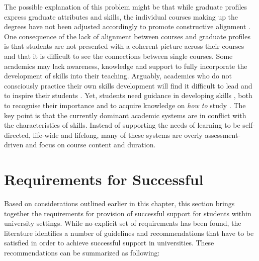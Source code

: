 The possible explanation of this problem might be that while graduate profiles
express graduate attributes and \LLLs skills, the individual courses making up
the degrees have not been adjusted accordingly to promote constructive alignment
\citep{Hughes2010,Biggs2007}. One consequence of the lack of alignment between
courses and graduate profiles is that students are not presented with a coherent
picture across their courses and that it is difficult to see the connections
between single courses. Some academics may lack awareness, knowledge and support
to fully incorporate the development of \LLLs skills into their teaching.
Arguably, academics who do not consciously practice their own \LLLs skills
development will find it difficult to lead and to inspire their students
\citep{Linden2003}. Yet, students need guidance in developing \LLLs skills
\citep{Leone2019}, both to recognise their importance and to acquire knowledge
on \textit{how to} study \citep{Medel-Anonuevo2001}. The key point is that the
currently dominant academic systems are in conflict with the characteristics of
\LLLs skills. Instead of supporting the needs of learning to be self-directed,
life-wide and lifelong, many of these systems are overly assessment-driven and
focus on course content and duration.

\section{Requirements for Successful \LLLc}
\label{sec:needs}
Based on considerations outlined earlier in this chapter, this section brings
together the requirements for provision of successful \LLLs support for
students within university settings. While no explicit set of requirements has
been found, the literature identifies a number of guidelines and recommendations
that have to be satisfied in order to achieve successful \LLLs support in
universities. These recommendations can be summarized as following:
 

